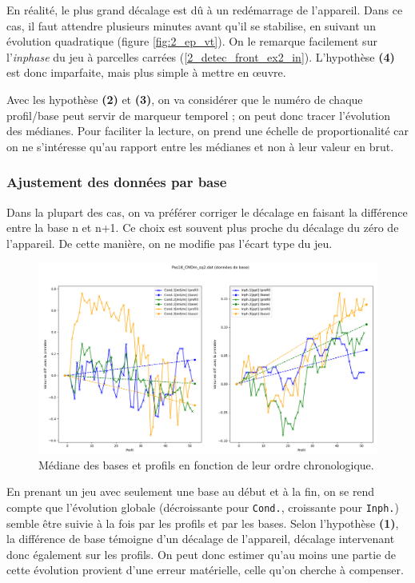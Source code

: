 \documentclass[12pt]{article}
\begin{document}
    En réalité, le plus grand décalage est dû à un redémarrage de l'appareil. Dans ce cas, il faut attendre plusieurs minutes avant qu'il se stabilise, en suivant un évolution quadratique (figure \ref{fig:2_ep_vt}). On le remarque facilement sur l'\textit{inphase} du jeu à parcelles carrées (\ref{2_detec_front_ex2_in}). L'hypothèse \textbf{(4)} est donc imparfaite, mais plus simple à mettre en œuvre.

    Avec les hypothèse \textbf{(2)} et \textbf{(3)}, on va considérer que le numéro de chaque profil/base peut servir de marqueur temporel ; on peut donc tracer l'évolution des médianes. Pour faciliter la lecture, on prend une échelle de proportionalité car on ne s'intéresse qu'au rapport entre les médianes et non à leur valeur en brut.

\subsubsection{Ajustement des données par base}

    Dans la plupart des cas, on va préférer corriger le décalage en faisant la différence entre la base n et n+1. Ce choix est souvent plus proche du décalage du zéro de l'appareil. De cette manière, on ne modifie pas l'écart type du jeu.

    \begin{figure}[ht!]
        \centering
        \includegraphics[width=\textwidth]{Images/Base_diff_Avant_sq2.png}  
        \caption{Médiane des bases et profils en fonction de leur ordre chronologique.}
    \end{figure}

    En prenant un jeu avec seulement une base au début et à la fin, on se rend compte que l'évolution globale (décroissante pour \texttt{Cond.}, croissante pour \texttt{Inph.}) semble être suivie à la fois par les profils et par les bases. Selon l'hypothèse \textbf{(1)}, la différence de base témoigne d'un décalage de l'appareil, décalage intervenant donc également sur les profils. On peut donc estimer qu'au moins une partie de cette évolution provient d'une erreur matérielle, celle qu'on cherche à compenser.
\end{document}
